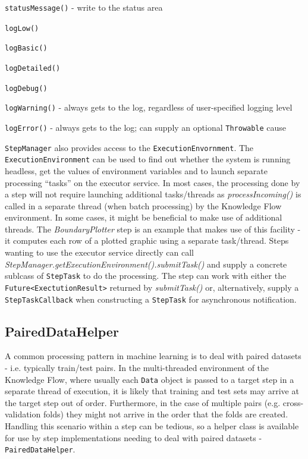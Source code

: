 \begin{tight_itemize}
  \item \verb=statusMessage()= - write to the status area
    \item \verb=logLow()=
    \item \verb=logBasic()=
    \item \verb=logDetailed()=
    \item \verb=logDebug()=
    \item \verb=logWarning()= - always gets to the log, regardless of user-specified logging level
    \item \verb=logError()= - always gets to the log; can supply an optional \verb=Throwable= cause
\end{tight_itemize}

\verb=StepManager= also provides access to the
\verb=ExecutionEnvornment=. The \verb=ExecutionEnvironment= can be
used to find out whether the system is running headless, get the
values of environment variables and to launch separate processing
``tasks'' on the executor service. In most cases, the processing done
by a step will not require launching additional tasks/threads as
\textit{processIncoming()} is called in a separate thread (when batch
processing) by the Knowledge Flow environment. In some cases, it might
be beneficial to make use of additional threads. The
\textit{BoundaryPlotter} step is an example that makes use of this
facility - it computes each row of a plotted graphic using a separate
task/thread. Steps wanting to use the executor service directly can
call \textit{StepManager.getExecutionEnvironment().submitTask()} and
supply a concrete sublcass of \verb=StepTask= to do the
processing. The step can work with either the
\verb=Future<ExectutionResult>= returned by \textit{submitTask()} or,
alternatively, supply a \verb=StepTaskCallback= when constructing a
\verb=StepTask= for asynchronous notification.

\subsection{PairedDataHelper}

A common processing pattern in machine learning is to deal with paired
datasets - i.e. typically train/test pairs. In the multi-threaded
environment of the Knowledge Flow, where usually each \verb=Data=
object is passed to a target step in a separate thread of execution,
it is likely that training and test sets may arrive at the target step
out of order. Furthermore, in the case of multiple pairs
(e.g. cross-validation folds) they might not arrive in the order that
the folds are created. Handling this scenario within a step can be
tedious, so a helper class is available for use by step
implementations needing to deal with paired datasets -
\verb=PairedDataHelper=.

